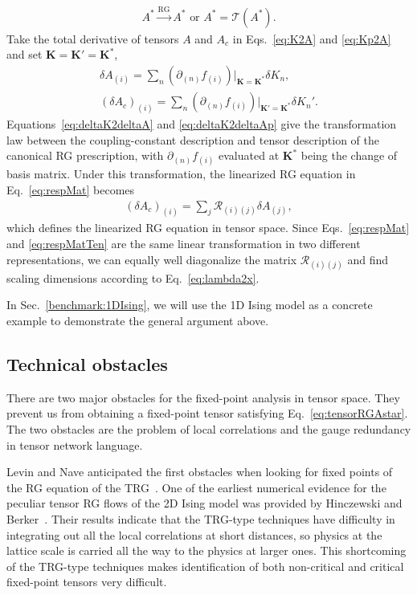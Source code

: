 \documentclass[aps,prr,reprint,superscriptaddress,floatfix]{revtex4-2}
\begin{document}
%
\begin{align}\label{eq:tensorRGAstar}
    A^* \xrightarrow{\text{RG}} A^* \text{ or }A^* = \mathcal{T}\left(A^* \right).
\end{align}
%
Take the total derivative of tensors $A$ and $A_c$ in Eqs.~\eqref{eq:K2A} and \eqref{eq:Kp2A} and set $\mathbf{K} = \mathbf{K}' = \mathbf{K}^*$, 
%
\begin{align}
    \delta A_{(i)} = \sum_n \left(\partial_{(n)}
    f_{(i)}\right)\Bigr|_{\mathbf{K} = \mathbf{K}^*} \delta K_n,
    \label{eq:deltaK2deltaA} \\
    \left(\delta A_c \right)_{(i)} = \sum_n \left(\partial_{(n)}
    f_{(i)}\right)\Bigr|_{\mathbf{K}' = \mathbf{K}^*} \delta
    K_n'.\label{eq:deltaK2deltaAp}
\end{align}
%
Equations~\eqref{eq:deltaK2deltaA} and \eqref{eq:deltaK2deltaAp} give the transformation law between the coupling-constant description and tensor description of the canonical RG prescription, with $\partial_{(n)}f_{(i)}$ evaluated at $\mathbf{K}^*$ being the change of basis matrix.
Under this transformation, the linearized RG equation in Eq.~\eqref{eq:respMat} becomes
%
\begin{align}\label{eq:respMatTen}
    \left(\delta A_c\right)_{(i)} = \sum_j
    \mathcal{R}_{(i)(j)} \delta A_{(j)},
\end{align}
%
which defines the linearized RG equation in tensor space.
Since Eqs.~\eqref{eq:respMat} and \eqref{eq:respMatTen} are the same linear transformation in two different representations, we can equally well diagonalize the matrix $\mathcal{R}_{(i)(j)}$ and find scaling dimensions according to Eq.~\eqref{eq:lambda2x}. 
%

In Sec.~\ref{benchmark:1DIsing}, we will use the 1D Ising model as a
concrete example to demonstrate the general argument above.
%

\subsection{Technical obstacles\label{sec:obstacles}}
There are two major obstacles for the fixed-point analysis in tensor space. 
They prevent us from obtaining a fixed-point tensor satisfying Eq.~\eqref{eq:tensorRGAstar}.
The two obstacles are the problem of local correlations and the gauge redundancy in tensor network language.
%

Levin and Nave anticipated the first obstacles when looking for fixed points of the RG equation of the TRG~\cite{LevinTalk}.
One of the earliest numerical evidence for the peculiar tensor RG flows of the 2D Ising model was provided by Hinczewski and Berker~\cite{Berker2008}. 
Their results indicate that the TRG-type techniques have difficulty in integrating out all the local correlations at short distances, so physics at the lattice scale is carried all the way to the physics at larger ones. 
This shortcoming of the TRG-type techniques makes identification of both non-critical and critical fixed-point tensors very difficult.
%
\end{document}
